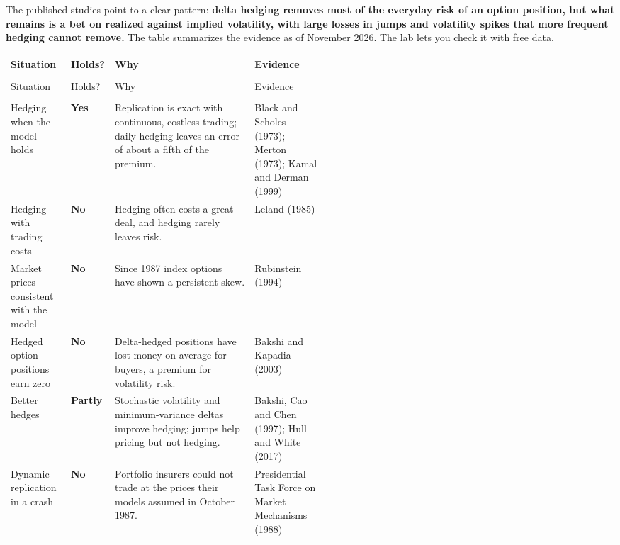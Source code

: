 The published studies point to a clear pattern: \textbf{delta hedging removes most of the everyday risk of an option position, but what remains is a bet on realized against implied volatility, with large losses in jumps and volatility spikes that more frequent hedging cannot remove.} The table summarizes the evidence as of November 2026. The lab lets you check it with free data.

{\small
\begin{longtable}{@{}>{\raggedright\arraybackslash}p{0.19\linewidth}>{\raggedright\arraybackslash}p{0.10\linewidth}>{\raggedright\arraybackslash}p{}>{\raggedright\arraybackslash}p{0.23\linewidth}@{}}
\toprule
Situation & Holds? & Why & Evidence \\
\midrule
\endfirsthead
\multicolumn{4}{@{}l}{\emph{(continued)}} \\
\toprule
Situation & Holds? & Why & Evidence \\
\midrule
\endhead
\midrule
\multicolumn{4}{r@{}}{\emph{(continued on the next page)}} \\
\endfoot
\bottomrule
\endlastfoot
Hedging when the model holds & \textbf{Yes} & Replication is exact with continuous, costless trading; daily hedging leaves an error of about a fifth of the premium. & Black and Scholes (1973); Merton (1973); Kamal and Derman (1999) \\
\addlinespace[3pt]
Hedging with trading costs & \textbf{No} & Hedging often costs a great deal, and hedging rarely leaves risk. & Leland (1985) \\
\addlinespace[3pt]
Market prices consistent with the model & \textbf{No} & Since 1987 index options have shown a persistent skew. & Rubinstein (1994) \\
\addlinespace[3pt]
Hedged option positions earn zero & \textbf{No} & Delta-hedged positions have lost money on average for buyers, a premium for volatility risk. & Bakshi and Kapadia (2003) \\
\addlinespace[3pt]
Better hedges & \textbf{Partly} & Stochastic volatility and minimum-variance deltas improve hedging; jumps help pricing but not hedging. & Bakshi, Cao and Chen (1997); Hull and White (2017) \\
\addlinespace[3pt]
Dynamic replication in a crash & \textbf{No} & Portfolio insurers could not trade at the prices their models assumed in October 1987. & Presidential Task Force on Market Mechanisms (1988) \\
\end{longtable}
}

